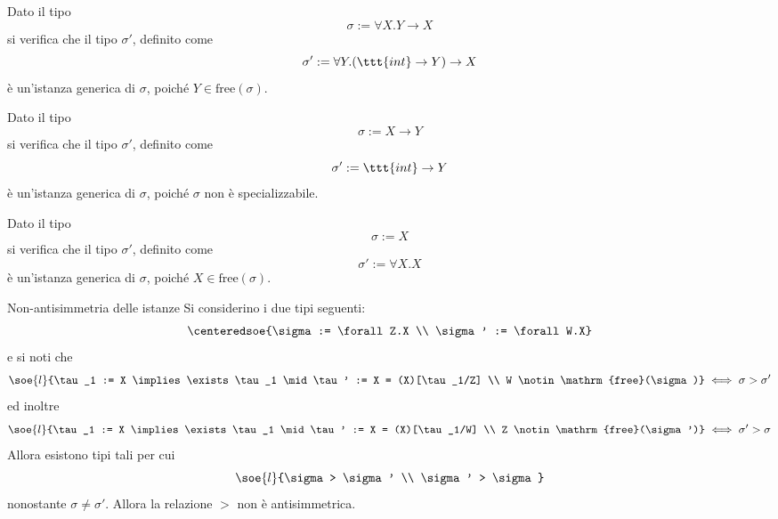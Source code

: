 \documentclass[a4paper, 12pt]{report}
\begin{document}
    \begin{nonexample}
        Dato il tipo $$\sigma := \forall X.Y \to X$$ si verifica che il tipo $\sigma'$, definito come $$\sigma' := \forall Y.(\ttt{int} \to Y) \to X$$  è un'istanza generica di $\sigma$, poiché $Y \in \mathrm{free}(\sigma)$.
    \end{nonexample}

    \begin{nonexample}
        Dato il tipo $$\sigma := X \to Y$$ si verifica che il tipo $\sigma'$, definito come $$\sigma' := \ttt{int} \to Y$$  è un'istanza generica di $\sigma$, poiché $\sigma$ non è specializzabile.
    \end{nonexample}

    \begin{nonexample}
        Dato il tipo $$\sigma := X$$ si verifica che il tipo $\sigma'$, definito come $$\sigma' := \forall X.X$$  è un'istanza generica di $\sigma$, poiché $X \in \mathrm{free}(\sigma)$.
    \end{nonexample}

    \begin{framedobs}{Non-antisimmetria delle istanze}
        Si considerino i due tipi seguenti: $$\centeredsoe{\sigma := \forall Z.X \\ \sigma' := \forall W.X}$$ e si noti che $$\soe{l}{\tau_1 := X \implies \exists \tau_1 \mid \tau' := X = (X)[\tau_1/Z] \\ W \notin \mathrm{free}(\sigma)} \iff \sigma > \sigma'$$ ed inoltre $$\soe{l}{\tau_1 := X \implies \exists \tau_1 \mid \tau' := X = (X)[\tau_1/W] \\ Z \notin \mathrm{free}(\sigma')} \iff \sigma' > \sigma$$ Allora esistono tipi tali per cui $$\soe{l}{\sigma > \sigma ' \\ \sigma' > \sigma}$$ nonostante $\sigma \neq \sigma'$. Allora la relazione $>$ non è antisimmetrica.
    \end{framedobs}
\end{document}
